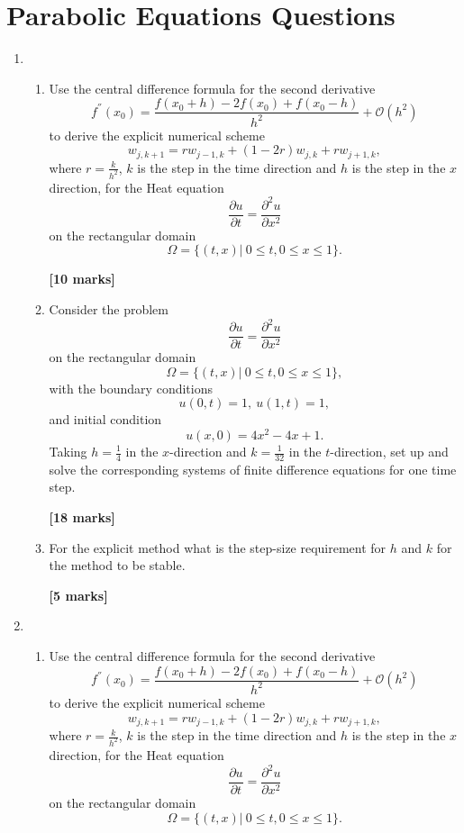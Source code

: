\section{Parabolic Equations Questions}
\begin{enumerate}
\subsection{Explicit Equations}
	\item 
\begin{enumerate}
	
	\item 
	Use the central difference formula for the second derivative 
	\[ f^{''}(x_0)=\frac{f(x_0+h)-2f(x_0)+f(x_0-h)}{h^2}+\mathcal{O}(h^2)\]
	to derive the explicit numerical scheme
	\[w_{j,k+1}=rw_{j-1,k}+(1-2r)w_{j,k}+rw_{j+1,k},\]
	where $r=\frac{k}{h^2}$, $k$ is the step in the time direction and $h$ is the step in the $x$ direction, 
	for the Heat equation 
	\[\frac{\partial u}{\partial t}=\frac{\partial^2 u}{\partial x^2} \]
	on the rectangular domain
	\[\Omega=\{(t,x)| \ 0\leq t, 0 \leq x \leq 1\}. \]
\begin{flushright}
\textbf{[10 marks]}
\end{flushright}
	
	\item Consider the problem
	\[\frac{\partial u}{\partial t}=\frac{\partial^2 u}{\partial x^2} \]
	on the rectangular domain
	\[\Omega=\{(t,x)| \ 0\leq t, 0 \leq x \leq 1\}, \]
	with the boundary conditions
	\[ u(0,t)=1, \ u(1,t)=1,   \]
	and initial condition
	\[	u(x,0)=4x^2-4x+1.\]
		Taking $h=\frac{1}{4}$ in the $x$-direction and $k=\frac{1}{32}$ in the $t$-direction, set up and solve the corresponding systems of finite difference equations for one time step.\\
\begin{flushright}
\textbf{[18 marks]}
\end{flushright}
	\item
	For the explicit method what is the step-size requirement for $h$ and $k$ for the method to be stable.
\begin{flushright}
\textbf{[5 marks]}
\end{flushright}
	
	
\end{enumerate}

	\item 
\begin{enumerate}
	
	\item 
	Use the central difference formula for the second derivative 
	\[ f^{''}(x_0)=\frac{f(x_0+h)-2f(x_0)+f(x_0-h)}{h^2}+\mathcal{O}(h^2)\]
	to derive the explicit numerical scheme
	\[w_{j,k+1}=rw_{j-1,k}+(1-2r)w_{j,k}+rw_{j+1,k},\]
	where $r=\frac{k}{h^2}$, $k$ is the step in the time direction and $h$ is the step in the $x$ direction, 
	for the Heat equation 
	\[\frac{\partial u}{\partial t}=\frac{\partial^2 u}{\partial x^2} \]
	on the rectangular domain
	\[\Omega=\{(t,x)| \ 0\leq t, 0 \leq x \leq 1\}. \]


\end{enumerate}
\end{enumerate}
